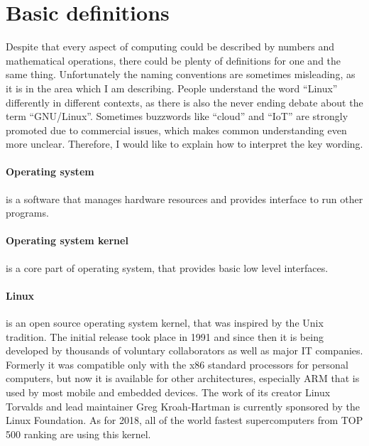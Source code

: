 \documentclass[printmode]{mgr}
\begin{document}
\section{Basic definitions}

Despite that every aspect of computing could be described by numbers and mathematical operations, there could be plenty of definitions for one and the same thing. Unfortunately the naming conventions are sometimes misleading, as it is in the area which I am describing. People understand the word ``Linux'' differently in different contexts, as there is also the never ending debate about the term ``GNU/Linux''.\cite{web:gnu-linux} Sometimes buzzwords like ``cloud'' and ``IoT'' are strongly promoted due to commercial issues, which makes common understanding even more unclear. Therefore, I would like to explain how to interpret the key wording.

\paragraph{Operating system} is a software that manages hardware resources and provides interface to run other programs.\cite{web:def-os}

\paragraph{Operating system kernel} is a core part of operating system, that provides  basic low level interfaces.\cite{web:def-kernel}

\paragraph{Linux} is an open source operating system kernel, that was inspired by the Unix tradition. The initial release took place in 1991 and since then it is being developed by thousands of voluntary collaborators as well as major IT companies. Formerly it was compatible only with the x86 standard processors for personal computers, but now it is available for other architectures, especially ARM that is used by most mobile and embedded devices. The work of its creator Linux Torvalds and lead maintainer Greg Kroah-Hartman is currently sponsored by the Linux Foundation. As for 2018, all of the world fastest supercomputers from TOP 500 ranking are using this kernel.
\end{document}
